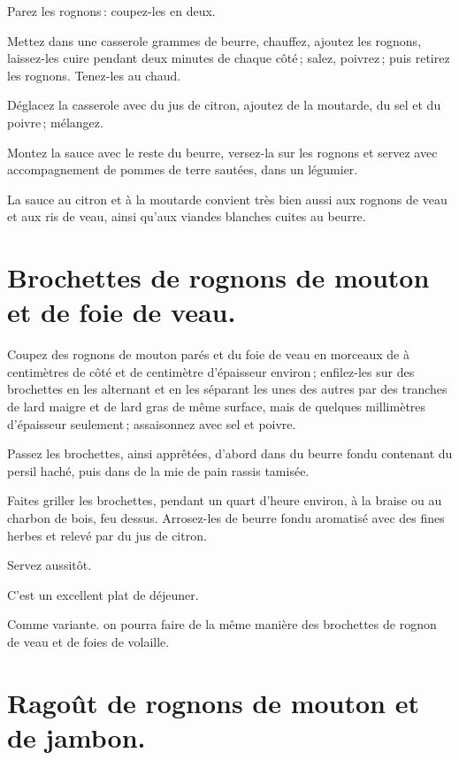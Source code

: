 Parez les rognons : coupez-les en deux.

Mettez dans une casserole {\mmm} grammes de beurre, chauffez, ajoutez les rognons,
laissez-les cuire pendant deux minutes de chaque côté ; salez, poivrez ; puis
retirez les rognons. Tenez-les au chaud.

Déglacez la casserole avec du jus de citron, ajoutez de la moutarde, du sel et
du poivre ; mélangez.

Montez la sauce avec le reste du beurre, versez-la sur les rognons et servez
avec accompagnement de pommes de terre sautées, dans un légumier.

\sk

La sauce au citron et à la moutarde convient très bien aussi aux rognons de
veau et aux ris de veau, ainsi qu'aux viandes blanches cuites au beurre.

\section*{\centering Brochettes de rognons de mouton et de foie de veau.}
{}

Coupez des rognons de mouton parés et du foie de veau en morceaux de
{\mmm} à {\mmm} centimètres de côté et de {\mmm} centimètre d'épaisseur environ ; enfilez-les
sur des brochettes en les alternant et en les séparant les unes des autres par
des tranches de lard maigre et de lard gras de même surface, mais de quelques
millimètres d'épaisseur seulement ; assaisonnez avec sel et poivre.

Passez les brochettes, ainsi apprêtées, d'abord dans du beurre fondu contenant
du persil haché, puis dans de la mie de pain rassis tamisée.

Faites griller les brochettes, pendant un quart d'heure environ, à la braise ou
au charbon de bois, feu dessus. Arrosez-les de beurre fondu aromatisé avec des
fines herbes et relevé par du jus de citron.

Servez aussitôt.

C'est un excellent plat de déjeuner.

\sk

Comme variante. on pourra faire de la même manière des brochettes de rognon
de veau et de foies de volaille.

\section*{\centering Ragoût de rognons de mouton et de jambon.}
{}

